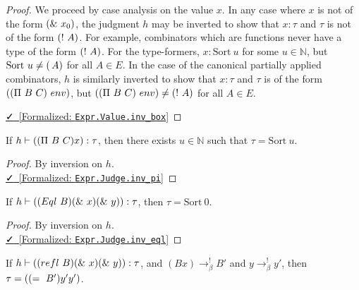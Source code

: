 \documentclass{lmcs}
\newcommand{\leanlink}[2]{
  \href{#1}{\textcolor{black}\faCheck~[Formalized: \texttt{#2}]}%
}
\newcommand{\arr}{\rightarrow}
\newcommand{\sort}[1]{\text{Sort}\ #1}
\newcommand{\barr}{\arr_{\beta}}
\begin{document}
\begin{proof}
  We proceed by case analysis on the value \(x\). In any case where \(x\) is not of the form \(\comb[\&][x_0]\), the judgment \(h\) may be inverted to show that \(x : \tau\) and \(\tau\) is not of the form \(\comb[!][A]\). For example, combinators which are functions never have a type of the form \(\comb[!][A]\). For the type-formers, \(x : \sort{u}\) for some \(u \in \mathbb{N}\), but \(\sort{u} \neq \comb[\!][A]\) for all \(A \in E\). In the case of the canonical partially applied combinators, \(h\) is similarly inverted to show that \(x : \tau\) and \(\tau\) is of the form \((\comb[\Pi][B][C]\ env)\), but \((\comb[\Pi][B][C]\ env) \neq \comb[!][A]\) for all \(A \in E\).

  \noindent \leanlink{https://github.com/lexzaiello/DCC/blob/fb7acf6d9644df7d13c809d12609b59eaca5c763/Dcc/Metatheory/Progress.lean\#L188}{Expr.Value.inv\_box}
\end{proof}

\begin{lem}\label{inv:pi}
  If \(h \vdash (\comb[\Pi][B][C] x) : \tau\), then there exists \(u \in \mathbb{N}\) such that \(\tau = \sort{u}\).
\end{lem}

\begin{proof}
  By inversion on \(h\).\\

  \noindent \leanlink{https://github.com/lexzaiello/DCC/blob/fb7acf6d9644df7d13c809d12609b59eaca5c763/Dcc/Metatheory/Progress.lean\#L375}{Expr.Judge.inv\_pi}
\end{proof}

\begin{lem}\label{inv:eq}
  If \(h \vdash (\comb[Eql][B] \comb[\&][x] \comb[\&][y]) : \tau\), then \(\tau = \sort{0}\).
\end{lem}

\begin{proof}
  By inversion on \(h\).\\
  \noindent \leanlink{https://github.com/lexzaiello/DCC/blob/fb7acf6d9644df7d13c809d12609b59eaca5c763/Dcc/Metatheory/Progress.lean\#L384}{Expr.Judge.inv\_eql}
\end{proof}

\begin{lem}\label{inv:refl}
  If \(h \vdash (\comb[refl][B] \comb[\&][x] \comb[\&][y]) : \tau\), and \((B x) \barr^{!} B'\) and \(y \barr^{!} y'\), then \(\tau = (\comb[=][B'] y' y')\).
\end{lem}
\end{document}
